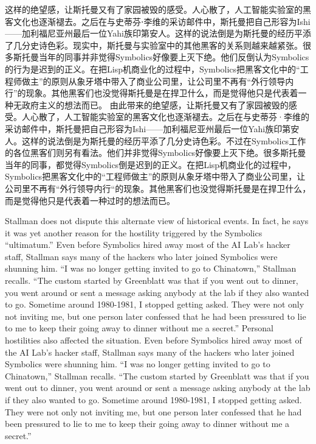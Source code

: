 \ifdefined\chs
\ifdefined\vone
这样的绝望感，让斯托曼又有了家园被毁的感受。人心散了，人工智能实验室的黑客文化也逐渐褪去。之后在与史蒂芬⋅李维的采访邮件中，斯托曼把自己形容为Ishi——加利福尼亚州最后一位Yahi族印第安人。这样的说法倒是为斯托曼的经历平添了几分史诗色彩。现实中，斯托曼与实验室中的其他黑客的关系则越来越紧张。很多斯托曼当年的同事并非觉得Symbolics好像要上灭下绝。他们反倒认为Symbolics的行为是迟到的正义。在把Lisp机商业化的过程中，Symbolics把黑客文化中的``工程师做主''的原则从象牙塔中带入了商业公司里，让公司里不再有``外行领导内行''的现象。其他黑客们也没觉得斯托曼是在捍卫什么，而是觉得他只是代表着一种无政府主义的想法而已。
\fi
\ifdefined\vtwo
由此带来的绝望感，让斯托曼又有了家园被毁的感受。人心散了，人工智能实验室的黑客文化也逐渐褪去。之后在与史蒂芬·李维的采访邮件中，斯托曼把自己形容为Ishi——加利福尼亚州最后一位Yahi族印第安人。这样的说法倒是为斯托曼的经历平添了几分史诗色彩。不过在Symbolics工作的各位黑客们则另有看法。他们并非觉得Symbolics好像要上灭下绝。很多斯托曼当年的同事，都觉得Symbolics倒是迟到的正义。在把Lisp机商业化的过程中，Symbolics把黑客文化中的``工程师做主''的原则从象牙塔中带入了商业公司里，让公司里不再有``外行领导内行``的现象。其他黑客们也没觉得斯托曼是在捍卫什么，而是觉得他只是代表着一种过时的想法而已。
\fi
\fi


\ifdefined\eng
\ifdefined\vone
Stallman does not dispute this alternate view of historical events. In fact, he says it was yet another reason for the hostility triggered by the Symbolics ``ultimatum.'' Even before Symbolics hired away most of the AI Lab's hacker staff, Stallman says many of the hackers who later joined Symbolics were shunning him. ``I was no longer getting invited to go to Chinatown,'' Stallman recalls. ``The custom started by Greenblatt was that if you went out to dinner, you went around or sent a message asking anybody at the lab if they also wanted to go. Sometime around 1980-1981, I stopped getting asked. They were not only not inviting me, but one person later confessed that he had been pressured to lie to me to keep their going away to dinner without me a secret.''
\fi
\ifdefined\vtwo
Personal hostilities also affected the situation.   Even before Symbolics hired away most of the AI Lab's hacker staff, Stallman says many of the hackers who later joined Symbolics were shunning him. ``I was no longer getting invited to go to Chinatown,'' Stallman recalls. ``The custom started by Greenblatt was that if you went out to dinner, you went around or sent a message asking anybody at the lab if they also wanted to go. Sometime around 1980-1981, I stopped getting asked. They were not only not inviting me, but one person later confessed that he had been pressured to lie to me to keep their going away to dinner without me a secret.''
\fi
\fi

